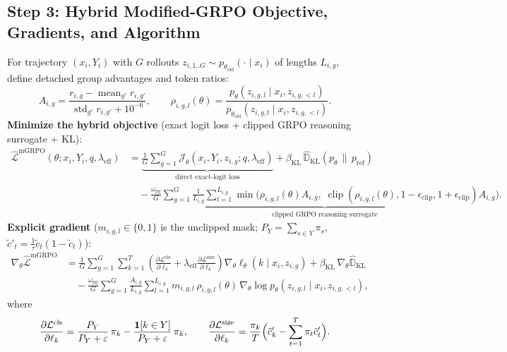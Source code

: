 \documentclass[10pt,a4paper]{article}
\newcommand{\Lcls}{\mathcal{L}^{\mathrm{cls}}}
\newcommand{\Lsize}{\mathcal{L}^{\mathrm{size}}}
\begin{document}
\subsection{Step 3: Hybrid Modified-GRPO Objective, Gradients, and Algorithm}
For trajectory $(x_i,Y_i)$ with $G$ rollouts $z_{i,1..G}\sim p_{\theta_{\mathrm{old}}}(\cdot\mid x_i)$ of lengths $L_{i,g}$, define detached group advantages and token ratios:
\[
A_{i,g} = \frac{r_{i,g} - \operatorname{mean}_{g'} r_{i,g'}}{\operatorname{std}_{g'} r_{i,g'} + 10^{-6}}, \qquad
\rho_{i,g,l}(\theta) = \frac{p_\theta(z_{i,g,l}\mid x_i, z_{i,g,<l})}{p_{\theta_{\mathrm{old}}}(z_{i,g,l}\mid x_i, z_{i,g,<l})}.
\]
\textbf{Minimize the hybrid objective} (exact logit loss + clipped GRPO reasoning surrogate + KL):
\begin{align}
\widehat{\mathcal{L}}^{\mathrm{mGRPO}}(\theta; x_i,Y_i,q,\lambda_{\mathrm{eff}})
&= \underbrace{\frac{1}{G}\sum_{g=1}^{G}\mathcal{J}_\theta(x_i,Y_i,z_{i,g};q,\lambda_{\mathrm{eff}})}_{\text{direct exact-logit loss}}
+ \beta_{\mathrm{KL}}\,\widehat{\mathbb{D}}_{\mathrm{KL}}(p_\theta \,\|\, p_{\mathrm{ref}}) \nonumber\\
&\quad - \underbrace{\frac{\omega_{\mathrm{pg}}}{G}\sum_{g=1}^{G}\frac{1}{L_{i,g}}\sum_{l=1}^{L_{i,g}}\min\!\Big(\rho_{i,g,l}(\theta)A_{i,g},\; \operatorname{clip}(\rho_{i,g,l}(\theta),1-\epsilon_{\mathrm{clip}},1+\epsilon_{\mathrm{clip}})A_{i,g}\Big)}_{\text{clipped GRPO reasoning surrogate}}. \label{eq:wp2-obj}
\end{align}
\textbf{Explicit gradient} ($m_{i,g,l}\in\{0,1\}$ is the unclipped mask; $P_Y=\sum_{s\in Y}\pi_s$, $\tilde c'_t=\frac{1}{\tau}\tilde c_t(1-\tilde c_t)$):
\begin{align}
\nabla_\theta \widehat{\mathcal{L}}^{\mathrm{mGRPO}}
&= \frac{1}{G}\sum_{g=1}^{G}\sum_{k=1}^{T}\left(\frac{\partial\Lcls}{\partial\ell_k} + \lambda_{\mathrm{eff}}\frac{\partial\Lsize}{\partial\ell_k}\right)\nabla_\theta\ell_\theta(k\mid x_i,z_{i,g})
+ \beta_{\mathrm{KL}}\,\nabla_\theta\widehat{\mathbb{D}}_{\mathrm{KL}} \nonumber\\
&\quad - \frac{\omega_{\mathrm{pg}}}{G}\sum_{g=1}^{G}\frac{A_{i,g}}{L_{i,g}}\sum_{l=1}^{L_{i,g}} m_{i,g,l}\,\rho_{i,g,l}(\theta)\,\nabla_\theta\log p_\theta(z_{i,g,l}\mid x_i, z_{i,g,<l}), \label{eq:wp2-grad}
\end{align}
where
\begin{equation}
\frac{\partial \Lcls}{\partial \ell_k} = \frac{P_Y}{P_Y+\varepsilon}\,\pi_k - \frac{\ind[k\in Y]}{P_Y+\varepsilon}\,\pi_k, \qquad
\frac{\partial \Lsize}{\partial \ell_k} = \frac{\pi_k}{T}\Big(\tilde c'_k - \sum_{t=1}^{T}\pi_t\tilde c'_t\Big). \label{eq:wp2-lgrad}
\end{equation}
\end{document}
